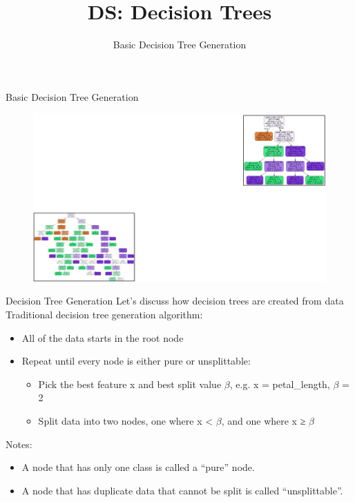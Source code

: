 \documentclass[aspectratio=169]{../latex_main/tntbeamer}  %
\title[Introduction]{DS: Decision Trees}
\subtitle{Basic Decision Tree Generation}
\begin{document}
	
	\maketitle
	\begin{frame}{Basic Decision Tree Generation}
	    \begin{figure}
	        \centering
	        \includegraphics[scale=.3]{figure_tree/Bild40}
	    \end{figure}
	\end{frame}
	
	\begin{frame}{Decision Tree Generation}
	    Let’s discuss how decision trees are created from data\\
	    \bigskip
	    Traditional decision tree generation algorithm: 
	    \begin{itemize}
	        \item All of the data starts in the root node
	        \item Repeat until every node is either pure or unsplittable:
	        \begin{itemize}
	            \item Pick the best feature x and best split value $\beta$, e.g. x = petal\_length, $\beta$ = 2
	            \item Split data into two nodes, one where x < $\beta$, and one where x ≥ $\beta$
	        \end{itemize}
	    \end{itemize}
	    
Notes: 
\begin{itemize}
    \item A node that has only one class is called a “\alert{pure}” node.
    \item A node that has duplicate data that cannot be split is called “\alert{unsplittable}”.
\end{itemize}

	\end{frame}
	
\end{document}

